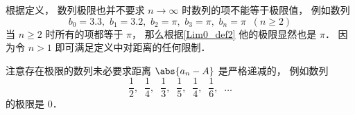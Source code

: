 \begin{example}{}
根据定义， 数列极限也并不要求 $n\to \infty$ 时数列的项不能等于极限值， 例如数列
\begin{equation}
b_0 = 3.3,\,\, b_1 = 3.2, \,\, b_2 = \pi, \,\, b_3 = \pi, \,\, b_n = \pi \;\; (n \ge 2)
\end{equation}
当 $n \ge 2$ 时所有的项都等于 $\pi$， 那么根据\autoref{Lim0_def2} 他的极限显然也是 $\pi$． 因为令 $n > 1$ 即可满足定义中对距离的任何限制．
\end{example}

\begin{example}{}
注意存在极限的数列未必要求距离 $\abs{a_n - A}$ 是严格递减的， 例如数列
\begin{equation}
\frac{1}{2},\;\; \frac{1}{4},\;\; \frac{1}{3},\;\; \frac{1}{5},\;\; \frac{1}{4},\;\; \frac{1}{6},\;\; \dots
\end{equation}
的极限是 $0$．
\end{example}

